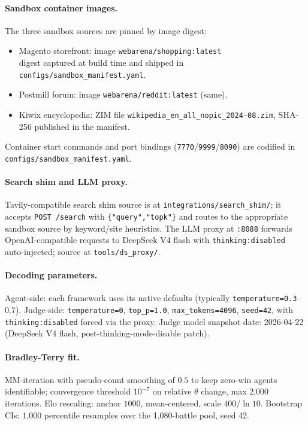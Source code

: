 \documentclass{article}
\begin{document}
\paragraph{Sandbox container images.} The three sandbox sources are pinned by image digest:
\begin{itemize}[leftmargin=*,itemsep=1pt]
\item Magento storefront: image \texttt{webarena/shopping:latest} \\ digest captured at build time and shipped in \texttt{configs/sandbox\_manifest.yaml}.
\item Postmill forum: image \texttt{webarena/reddit:latest} (same).
\item Kiwix encyclopedia: ZIM file \texttt{wikipedia\_en\_all\_nopic\_2024-08.zim}, SHA-256 published in the manifest.
\end{itemize}
Container start commands and port bindings (\texttt{7770}/\texttt{9999}/\texttt{8090}) are codified in \texttt{configs/sandbox\_manifest.yaml}.

\paragraph{Search shim and LLM proxy.} Tavily-compatible search shim source is at \texttt{integrations/search\_shim/}; it accepts \texttt{POST /search} with \texttt{\{"query","topk"\}} and routes to the appropriate sandbox source by keyword/site heuristics. The LLM proxy at \texttt{:8088} forwards OpenAI-compatible requests to DeepSeek V4 flash with \texttt{thinking:disabled} auto-injected; source at \texttt{tools/ds\_proxy/}.

\paragraph{Decoding parameters.} Agent-side: each framework uses its native defaults (typically \texttt{temperature=0.3}--$0.7$). Judge-side: \texttt{temperature=0}, \texttt{top\_p=1.0}, \texttt{max\_tokens=4096}, \texttt{seed=42}, with \texttt{thinking:disabled} forced via the proxy. Judge model snapshot date: 2026-04-22 (DeepSeek V4 flash, post-thinking-mode-disable patch).

\paragraph{Bradley-Terry fit.} MM-iteration with pseudo-count smoothing of $0.5$ to keep zero-win agents identifiable; convergence threshold $10^{-7}$ on relative $\theta$ change, max 2{,}000 iterations. Elo rescaling: anchor $1000$, mean-centered, scale $400 / \ln 10$. Bootstrap CIs: 1{,}000 percentile resamples over the 1{,}080-battle pool, seed 42.
\end{document}
